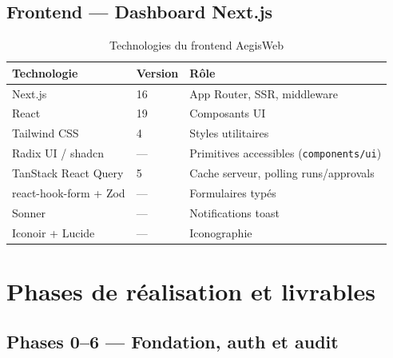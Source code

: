 \subsection{Frontend — Dashboard Next.js}

\begin{table}[H]
\centering
\caption{Technologies du frontend AegisWeb}
\label{tab:tech_frontend}
\begin{tabularx}{\textwidth}{@{}p{3.6cm}p{2.4cm}X@{}}
\toprule
\textbf{Technologie}      & \textbf{Version}  & \textbf{Rôle} \\
\midrule
\rowcolor{rowgray}
Next.js                   & 16                & App Router, SSR, middleware \\
React                     & 19                & Composants UI \\
\rowcolor{rowgray}
Tailwind CSS              & 4                 & Styles utilitaires \\
Radix UI / shadcn         & —                 & Primitives accessibles (\texttt{components/ui}) \\
\rowcolor{rowgray}
TanStack React Query      & 5                 & Cache serveur, polling runs/approvals \\
react-hook-form + Zod     & —                 & Formulaires typés \\
\rowcolor{rowgray}
Sonner                    & —                 & Notifications toast \\
Iconoir + Lucide          & —                 & Iconographie \\
\bottomrule
\end{tabularx}
\end{table}

\section{Phases de réalisation et livrables}

\subsection{Phases 0--6 — Fondation, auth et audit}

